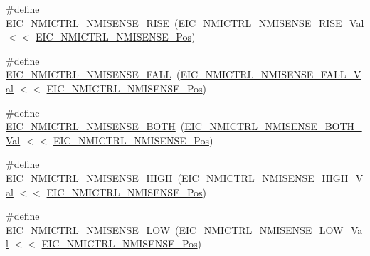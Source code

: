 \begin{DoxyCompactItemize}
\item 
\#define \mbox{\hyperlink{group___s_a_m_d21___e_i_c_gaa8f021b20a26f0619fac57f6ef9547e3}{E\+I\+C\+\_\+\+N\+M\+I\+C\+T\+R\+L\+\_\+\+N\+M\+I\+S\+E\+N\+S\+E\+\_\+\+R\+I\+SE}}~(\mbox{\hyperlink{group___s_a_m_d21___e_i_c_ga40a369ae631516099e85c14096312797}{E\+I\+C\+\_\+\+N\+M\+I\+C\+T\+R\+L\+\_\+\+N\+M\+I\+S\+E\+N\+S\+E\+\_\+\+R\+I\+S\+E\+\_\+\+Val}} $<$$<$ \mbox{\hyperlink{group___s_a_m_d21___e_i_c_ga48859c121f51b57ddf343ba53ff169a1}{E\+I\+C\+\_\+\+N\+M\+I\+C\+T\+R\+L\+\_\+\+N\+M\+I\+S\+E\+N\+S\+E\+\_\+\+Pos}})
\item 
\#define \mbox{\hyperlink{group___s_a_m_d21___e_i_c_gaa9b32280bacb50689c86bd21de314ae7}{E\+I\+C\+\_\+\+N\+M\+I\+C\+T\+R\+L\+\_\+\+N\+M\+I\+S\+E\+N\+S\+E\+\_\+\+F\+A\+LL}}~(\mbox{\hyperlink{group___s_a_m_d21___e_i_c_gaa0a05bae1746f2942044c926350f1ebe}{E\+I\+C\+\_\+\+N\+M\+I\+C\+T\+R\+L\+\_\+\+N\+M\+I\+S\+E\+N\+S\+E\+\_\+\+F\+A\+L\+L\+\_\+\+Val}} $<$$<$ \mbox{\hyperlink{group___s_a_m_d21___e_i_c_ga48859c121f51b57ddf343ba53ff169a1}{E\+I\+C\+\_\+\+N\+M\+I\+C\+T\+R\+L\+\_\+\+N\+M\+I\+S\+E\+N\+S\+E\+\_\+\+Pos}})
\item 
\#define \mbox{\hyperlink{group___s_a_m_d21___e_i_c_gad83b3c9ea023f0c8c0c56b5a027c7ae4}{E\+I\+C\+\_\+\+N\+M\+I\+C\+T\+R\+L\+\_\+\+N\+M\+I\+S\+E\+N\+S\+E\+\_\+\+B\+O\+TH}}~(\mbox{\hyperlink{group___s_a_m_d21___e_i_c_ga7c987cbee9b60bfd4e68ddd11982a512}{E\+I\+C\+\_\+\+N\+M\+I\+C\+T\+R\+L\+\_\+\+N\+M\+I\+S\+E\+N\+S\+E\+\_\+\+B\+O\+T\+H\+\_\+\+Val}} $<$$<$ \mbox{\hyperlink{group___s_a_m_d21___e_i_c_ga48859c121f51b57ddf343ba53ff169a1}{E\+I\+C\+\_\+\+N\+M\+I\+C\+T\+R\+L\+\_\+\+N\+M\+I\+S\+E\+N\+S\+E\+\_\+\+Pos}})
\item 
\#define \mbox{\hyperlink{group___s_a_m_d21___e_i_c_ga7d49f4b3ad088c21e1e248b6ead40a4d}{E\+I\+C\+\_\+\+N\+M\+I\+C\+T\+R\+L\+\_\+\+N\+M\+I\+S\+E\+N\+S\+E\+\_\+\+H\+I\+GH}}~(\mbox{\hyperlink{group___s_a_m_d21___e_i_c_ga30c9d119b917f1bec88af90d0c7fa180}{E\+I\+C\+\_\+\+N\+M\+I\+C\+T\+R\+L\+\_\+\+N\+M\+I\+S\+E\+N\+S\+E\+\_\+\+H\+I\+G\+H\+\_\+\+Val}} $<$$<$ \mbox{\hyperlink{group___s_a_m_d21___e_i_c_ga48859c121f51b57ddf343ba53ff169a1}{E\+I\+C\+\_\+\+N\+M\+I\+C\+T\+R\+L\+\_\+\+N\+M\+I\+S\+E\+N\+S\+E\+\_\+\+Pos}})
\item 
\#define \mbox{\hyperlink{group___s_a_m_d21___e_i_c_gaee7719cf601b054085fc6d588052ed3c}{E\+I\+C\+\_\+\+N\+M\+I\+C\+T\+R\+L\+\_\+\+N\+M\+I\+S\+E\+N\+S\+E\+\_\+\+L\+OW}}~(\mbox{\hyperlink{group___s_a_m_d21___e_i_c_gaa3b9af8d6d835716ec282a17a72f7052}{E\+I\+C\+\_\+\+N\+M\+I\+C\+T\+R\+L\+\_\+\+N\+M\+I\+S\+E\+N\+S\+E\+\_\+\+L\+O\+W\+\_\+\+Val}}  $<$$<$ \mbox{\hyperlink{group___s_a_m_d21___e_i_c_ga48859c121f51b57ddf343ba53ff169a1}{E\+I\+C\+\_\+\+N\+M\+I\+C\+T\+R\+L\+\_\+\+N\+M\+I\+S\+E\+N\+S\+E\+\_\+\+Pos}})
$$
\end{DoxyCompactItemize}
